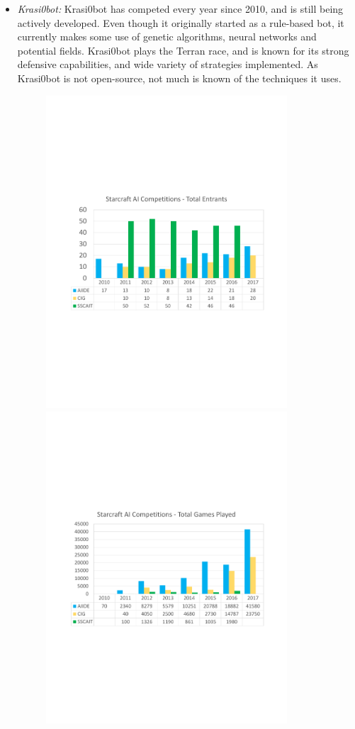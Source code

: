 \begin{itemize}
  \item {\em Krasi0bot:} Krasi0bot has competed every year since 2010, and is still being actively developed. Even though it originally started as a rule-based bot, it currently makes some use of genetic algorithms, neural networks and potential fields. Krasi0bot plays the Terran race, and is known for its strong defensive capabilities, and wide variety of strategies implemented. As Krasi0bot is not open-source, not much is known of the techniques it uses. 
  \begin{figure}[t]
  \begin{center}
  \includegraphics[width=9cm]{fig/Entrants}
	\includegraphics[width=9cm]{fig/GamesPlayed}

\end{center}
\end{figure}
\end{itemize}
